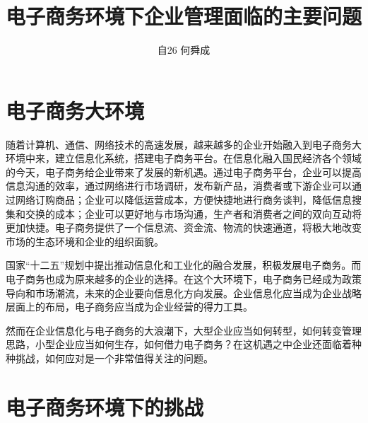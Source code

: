 \documentclass[UTF8]{ctexart}
\author{自26 何舜成}
\title{电子商务环境下企业管理面临的主要问题}
\begin{document}
\maketitle
\tableofcontents
\section{电子商务大环境}
随着计算机、通信、网络技术的高速发展，越来越多的企业开始融入到电子商务大环境中来，建立信息化系统，搭建电子商务平台。在信息化融入国民经济各个领域的今天，电子商务给企业带来了发展的新机遇。通过电子商务平台，企业可以提高信息沟通的效率，通过网络进行市场调研，发布新产品，消费者或下游企业可以通过网络订购商品；企业可以降低运营成本，方便快捷地进行商务谈判，降低信息搜集和交换的成本；企业可以更好地与市场沟通，生产者和消费者之间的双向互动将更加快捷。电子商务提供了一个信息流、资金流、物流的快速通道，将极大地改变市场的生态环境和企业的组织面貌。\par
国家“十二五”规划中提出推动信息化和工业化的融合发展，积极发展电子商务。\cite{Plan}而电子商务也成为原来越多的企业的选择。在这个大环境下，电子商务已经成为政策导向和市场潮流，未来的企业要向信息化方向发展。企业信息化应当成为企业战略层面上的布局，电子商务应当成为企业经营的得力工具。\par
然而在企业信息化与电子商务的大浪潮下，大型企业应当如何转型，如何转变管理思路，小型企业应当如何生存，如何借力电子商务？在这机遇之中企业还面临着种种挑战，如何应对是一个非常值得关注的问题。\par

\section{电子商务环境下的挑战}
\end{document}

